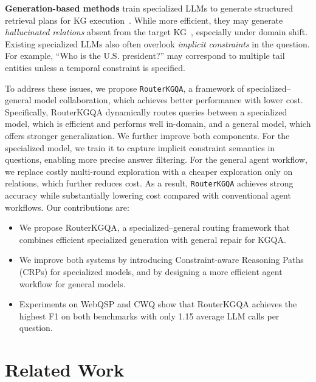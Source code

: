 \documentclass[11pt]{article}
\begin{document}
\textbf{Generation-based methods} train specialized LLMs to generate structured retrieval plans for KG execution~\citep{luo-etal-2024-chatkbqa,luo2024rog,pmlr-v267-luo25t}. While more efficient, they may generate \emph{hallucinated relations} absent from the target KG~\citep{tian-etal-2025-compkbqa}, especially under domain shift. Existing specialized LLMs also often overlook \emph{implicit constraints} in the question. For example, ``Who is the U.S. president?'' may correspond to multiple tail entities unless a temporal constraint is specified.

To address these issues, we propose \texttt{RouterKGQA}, a framework of specialized--general model collaboration, which achieves better performance with lower cost. Specifically, RouterKGQA dynamically routes queries between a specialized model, which is efficient and performs well in-domain, and a general model, which offers stronger generalization. We further improve both components. For the specialized model, we train it to capture implicit constraint semantics in questions, enabling more precise answer filtering. For the general agent workflow, we replace costly multi-round exploration with a cheaper exploration only on relations, which further reduces cost. As a result, \texttt{RouterKGQA} achieves strong accuracy while substantially lowering cost compared with conventional agent workflows. Our contributions are:

\begin{itemize}
    \item We propose RouterKGQA, a specialized--general routing framework that combines efficient specialized generation with general repair for KGQA.
    \item We improve both systems by introducing Constraint-aware Reasoning Paths (CRPs) for specialized models, and by designing a more efficient agent workflow for general models.
    \item Experiments on WebQSP and CWQ show that RouterKGQA achieves the highest F1 on both benchmarks with only 1.15 average LLM calls per question.
\end{itemize}


\section{Related Work}
\label{sec:related_work}
\end{document}
